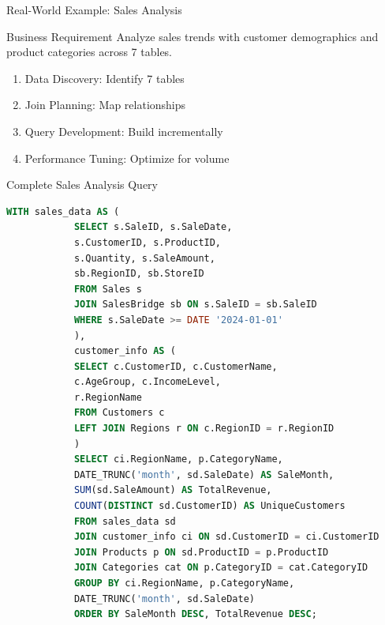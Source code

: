 \documentclass{beamer}
\begin{document}
	\begin{frame}{Real-World Example: Sales Analysis}
		\begin{block}{Business Requirement}
			Analyze sales trends with customer demographics and product categories across 7 tables.
		\end{block}
		\begin{enumerate}
			\item Data Discovery: Identify 7 tables
			\item Join Planning: Map relationships
			\item Query Development: Build incrementally
			\item Performance Tuning: Optimize for volume
		\end{enumerate}
	\end{frame}
	
	\begin{frame}[fragile]{Complete Sales Analysis Query}
		\begin{lstlisting}[language=SQL, caption=Complex Sales Analysis]
			WITH sales_data AS (
			SELECT s.SaleID, s.SaleDate, 
			s.CustomerID, s.ProductID,
			s.Quantity, s.SaleAmount,
			sb.RegionID, sb.StoreID
			FROM Sales s
			JOIN SalesBridge sb ON s.SaleID = sb.SaleID
			WHERE s.SaleDate >= DATE '2024-01-01'
			),
			customer_info AS (
			SELECT c.CustomerID, c.CustomerName,
			c.AgeGroup, c.IncomeLevel,
			r.RegionName
			FROM Customers c
			LEFT JOIN Regions r ON c.RegionID = r.RegionID
			)
			SELECT ci.RegionName, p.CategoryName,
			DATE_TRUNC('month', sd.SaleDate) AS SaleMonth,
			SUM(sd.SaleAmount) AS TotalRevenue,
			COUNT(DISTINCT sd.CustomerID) AS UniqueCustomers
			FROM sales_data sd
			JOIN customer_info ci ON sd.CustomerID = ci.CustomerID
			JOIN Products p ON sd.ProductID = p.ProductID
			JOIN Categories cat ON p.CategoryID = cat.CategoryID
			GROUP BY ci.RegionName, p.CategoryName,
			DATE_TRUNC('month', sd.SaleDate)
			ORDER BY SaleMonth DESC, TotalRevenue DESC;
		\end{lstlisting}
	\end{frame}
	
\end{document}
